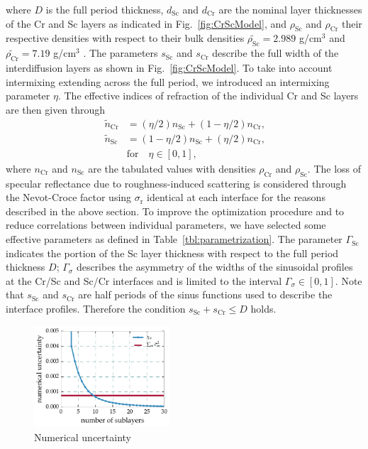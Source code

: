 where $D$ is the full period thickness, $d_\text{Sc}$ and $d_\text{Cr}$ are the 
nominal layer thicknesses of the Cr and Sc layers as indicated in 
Fig.~\ref{fig:CrScModel}, and $\rho_\text{Sc}$ and $\rho_\text{Cr}$ their 
respective densities with respect to their bulk densities 
$\tilde{\rho_\text{Sc}} = 2.989$ g/cm$^3$ and $\tilde{\rho_\text{Cr}} = 7.19$ 
g/cm$^3$ \cite{henke_x-ray_1993}. The parameters $s_\text{Sc}$ and $s_\text{Cr}$ describe 
the full width of the interdiffusion layers as shown in 
Fig.~\ref{fig:CrScModel}. To take into account intermixing extending across the 
full period, we introduced an intermixing parameter $\eta$. The effective 
indices of refraction of the individual Cr and Sc layers are then given through
\begin{align}
\tilde{n}_\text{Cr} &=(\eta/2) n_\text{Sc} + (1-\eta/2) n_\text{Cr} \text{,} 
\nonumber\\
\tilde{n}_\text{Sc} &=(1-\eta/2) n_\text{Sc} + (\eta/2) n_\text{Cr} \text{,} 
\label{eqn:effective_n} \\
&\text{for} \quad \eta \in [0,1] \text{,}\nonumber
\end{align}
where $n_\text{Cr}$ and $n_\text{Sc}$ are the tabulated values \cite{henke_x-ray_1993} 
with densities $\rho_\text{Cr}$ and $\rho_\text{Sc}$. The loss of specular 
reflectance due to roughness-induced scattering is considered through the 
Nevot-Croce factor using $\sigma_\text{r}$ identical at each interface for the 
reasons described in the above section. To improve the optimization procedure 
and to reduce correlations between individual parameters, we have selected some 
effective parameters as defined in Table~\ref{tbl:parametrization}. The 
parameter $\Gamma_\text{Sc}$ indicates the portion of the Sc layer thickness 
with respect to the full period thickness $D$; $\Gamma_\sigma$ describes the 
asymmetry of the widths of the sinusoidal profiles at the Cr/Sc and Sc/Cr 
interfaces and is limited to the interval $\Gamma_\sigma \in [0,1]$. Note that 
$s_\text{Sc}$ and $s_\text{Cr}$ are half periods of the sinus functions used to 
describe the interface profiles. Therefore the condition $s_\text{Sc} + 
s_\text{Cr} \leq D$ holds.
\begin{figure}[htbp]
  \centering
  \includegraphics[width=0.45\textwidth]{img/CrSc_numerical_uncertainty_mixlayer}
  \caption{Numerical uncertainty}
  \label{ch_spec:fig_CrSc_numerical_uncertainty_mixlayer}
\end{figure}



